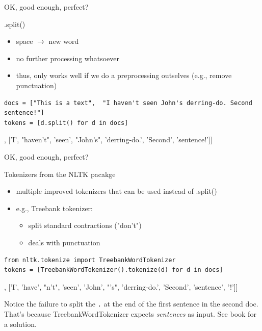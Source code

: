 \documentclass[handout]{beamer}
\begin{document}
\begin{frame}[fragile]{OK, good enough, perfect?}
\begin{block}{.split()}
\begin{itemize}
	\item space $\rightarrow$ new word
	\item no further processing whatsoever
	\item thus, only works well if we do a preprocessing outselves (e.g., remove punctuation)
\end{itemize}
\end{block}
\begin{lstlisting}
docs = ["This is a text",  "I haven't seen John's derring-do. Second sentence!"]
tokens = [d.split() for d in docs]
\end{lstlisting}
\begin{lstlistingoutputtiny}
[['This', 'is', 'a', 'text'], ['I', "haven't", 'seen', "John's", 'derring-do.', 'Second', 'sentence!']]
\end{lstlistingoutputtiny}
\end{frame}


\begin{frame}[fragile]{OK, good enough, perfect?}
\begin{block}{Tokenizers from the NLTK pacakge}
\begin{itemize}
\item multiple improved tokenizers that can be used instead of .split()
\item e.g., Treebank tokenizer:
\begin{itemize}
	\item split standard contractions ("don't")
	\item deals with punctuation
\end{itemize}			
\end{itemize}
\end{block}
\begin{lstlisting}
from nltk.tokenize import TreebankWordTokenizer
tokens = [TreebankWordTokenizer().tokenize(d) for d in docs]
\end{lstlisting}
\begin{lstlistingoutputtiny}
[['This', 'is', 'a', 'text'],  ['I', 'have', "n't", 'seen', 'John', "'s", 'derring-do.', 'Second', 'sentence', '!']]
\end{lstlistingoutputtiny}
\tiny{Notice the failure to split the \texttt{.} at the end of the first sentence in the second doc. That's because TreebankWordTokenizer expects \emph{sentences} as input. See book for a solution.\\}
\end{frame}
\end{document}
